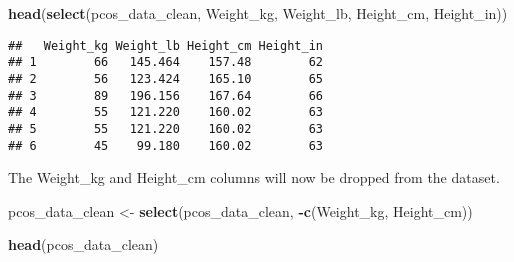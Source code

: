 \documentclass[
]{article}
\newenvironment{Shaded}{\begin{snugshade}}{\end{snugshade}}
\newcommand{\FunctionTok}[1]{\textcolor[rgb]{0.13,0.29,0.53}{\textbf{#1}}}
\newcommand{\NormalTok}[1]{#1}
\newcommand{\OtherTok}[1]{\textcolor[rgb]{0.56,0.35,0.01}{#1}}
\newcommand{\SpecialCharTok}[1]{\textcolor[rgb]{0.81,0.36,0.00}{\textbf{#1}}}
\begin{document}
\begin{Shaded}
\begin{Highlighting}[]
\FunctionTok{head}\NormalTok{(}\FunctionTok{select}\NormalTok{(pcos\_data\_clean, Weight\_kg, Weight\_lb, Height\_cm, Height\_in))}
\end{Highlighting}
\end{Shaded}

\begin{verbatim}
##   Weight_kg Weight_lb Height_cm Height_in
## 1        66   145.464    157.48        62
## 2        56   123.424    165.10        65
## 3        89   196.156    167.64        66
## 4        55   121.220    160.02        63
## 5        55   121.220    160.02        63
## 6        45    99.180    160.02        63
\end{verbatim}

The Weight\_kg and Height\_cm columns will now be dropped from the
dataset.

\begin{Shaded}
\begin{Highlighting}[]
\NormalTok{pcos\_data\_clean }\OtherTok{\textless{}{-}} \FunctionTok{select}\NormalTok{(pcos\_data\_clean, }\SpecialCharTok{{-}}\FunctionTok{c}\NormalTok{(Weight\_kg, Height\_cm))}
\end{Highlighting}
\end{Shaded}

\begin{Shaded}
\begin{Highlighting}[]
\FunctionTok{head}\NormalTok{(pcos\_data\_clean)}
\end{Highlighting}
\end{Shaded}
\end{document}
